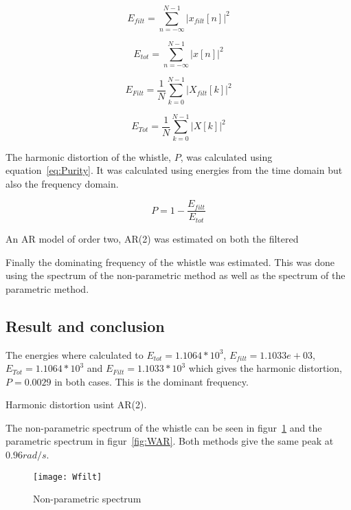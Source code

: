 \documentclass[10pt]{article}
\begin{document}
\begin{equation}
  \label{eq:Etimefilt}
  E_{filt} =\sum\limits_{n=-\infty}^{N-1} |x_{filt}[n]|^2
\end{equation}

\begin{equation}
  \label{eq:Etime}
  E_{tot} =\sum\limits_{n=-\infty}^{N-1} |x[n]|^2
\end{equation}

\begin{equation}
  \label{eq:Efeqfilt}
  E_{Filt} =\frac{1}{N}\sum\limits_{k=0}^{N-1} |X_{filt}[k]|^2
\end{equation}

\begin{equation}
  \label{eq:Efeq}
  E_{Tot} =\frac{1}{N}\sum\limits_{k=0}^{N-1} |X[k]|^2
\end{equation}

The harmonic distortion of the whistle, $P$, was calculated using
equation~\ref{eq:Purity}. It was calculated using energies from
the time domain but also the frequency domain.

\begin{equation}
  \label{eq:Purity}
  P =1-\frac{E_{filt}}{E_{tot}}
\end{equation}

An AR model of order two, AR(2) was estimated on both the filtered

Finally the dominating frequency of the whistle was estimated.
This was done using the spectrum of the non-parametric method
as well as the spectrum of the parametric method.

\subsection{Result and conclusion}
The energies where calculated to $E_{tot}=1.1064*10^3$, $E_{filt}=1.1033e+03$,
$E_{Tot}=1.1064*10^3$ and $E_{Filt}=1.1033*10^3$ which gives the harmonic distortion,
$P= 0.0029$ in both cases. This is the dominant frequency.

Harmonic distortion usint AR(2).

The non-parametric spectrum of the whistle can be seen in figur~\ref{fig:Wfilt}
and the parametric spectrum in figur~\ref{fig:WAR}. Both methods give the same peak
at $0.96 rad/s$.
\begin{figure}[!hp]

    \begin{center}
      \texttt{[image: Wfilt]}
    \caption{Non-parametric spectrum \label{fig:Wfilt}}
    \end{center}

\end{figure}
\end{document}
